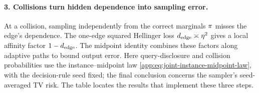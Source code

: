 \paragraph{3. Collisions turn hidden dependence into sampling error.}
At a collision, sampling independently from the correct marginals
\(\pi\) misses the edge's dependence.  The one-edge squared
Hellinger loss \(d_{\mathrm{edge}}\asymp\eta^2\) gives a local
affinity factor \(1-d_{\mathrm{edge}}\).  The midpoint identity combines
these factors along adaptive paths to bound output error.
Here query-disclosure and collision probabilities use the
instance--midpoint law \eqref{app:eq:joint-instance-midpoint-law}, with
the decision-rule seed fixed; the final conclusion concerns the sampler's
seed-averaged TV risk.  The table locates the results that implement these
three steps.

